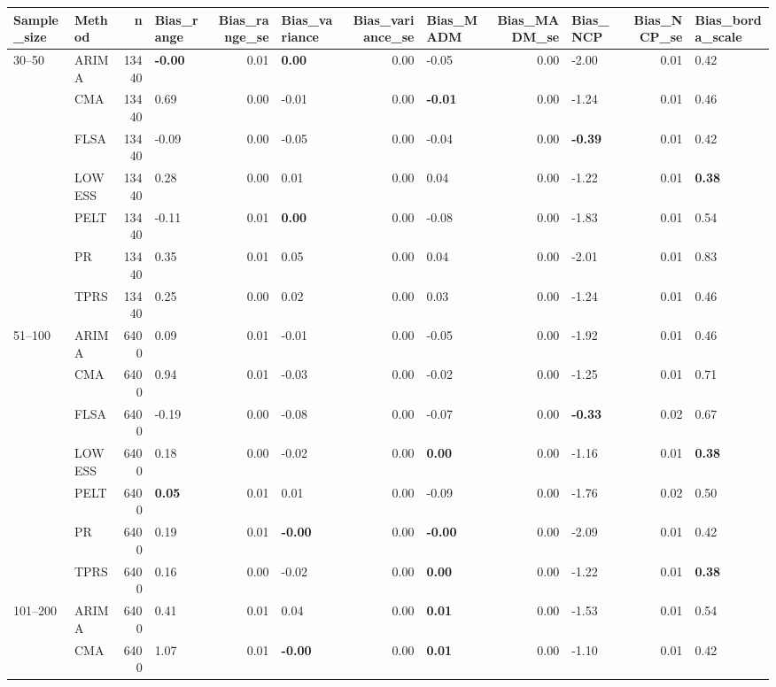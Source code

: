 \begin{table}[ht]
\centering
\begin{tabular}{llrlrlrlrlrl}
  \toprule
Sample_size & Method & n & Bias_range & Bias_range_se & Bias_variance & Bias_variance_se & Bias_MADM & Bias_MADM_se & Bias_NCP & Bias_NCP_se & Bias_borda_scale \\ 
  \midrule
30–50 & ARIMA & 13440 & \textbf{-0.00} & 0.01 & \textbf{0.00} & 0.00 & -0.05 & 0.00 & -2.00 & 0.01 & 0.42 \\ 
   & CMA & 13440 & 0.69 & 0.00 & -0.01 & 0.00 & \textbf{-0.01} & 0.00 & -1.24 & 0.01 & 0.46 \\ 
   & FLSA & 13440 & -0.09 & 0.00 & -0.05 & 0.00 & -0.04 & 0.00 & \textbf{-0.39} & 0.01 & 0.42 \\ 
   & LOWESS & 13440 & 0.28 & 0.00 & 0.01 & 0.00 & 0.04 & 0.00 & -1.22 & 0.01 & \textbf{0.38} \\ 
   & PELT & 13440 & -0.11 & 0.01 & \textbf{0.00} & 0.00 & -0.08 & 0.00 & -1.83 & 0.01 & 0.54 \\ 
   & PR & 13440 & 0.35 & 0.01 & 0.05 & 0.00 & 0.04 & 0.00 & -2.01 & 0.01 & 0.83 \\ 
   & TPRS & 13440 & 0.25 & 0.00 & 0.02 & 0.00 & 0.03 & 0.00 & -1.24 & 0.01 & 0.46 \\ 
  51–100 & ARIMA & 6400 & 0.09 & 0.01 & -0.01 & 0.00 & -0.05 & 0.00 & -1.92 & 0.01 & 0.46 \\ 
   & CMA & 6400 & 0.94 & 0.01 & -0.03 & 0.00 & -0.02 & 0.00 & -1.25 & 0.01 & 0.71 \\ 
   & FLSA & 6400 & -0.19 & 0.00 & -0.08 & 0.00 & -0.07 & 0.00 & \textbf{-0.33} & 0.02 & 0.67 \\ 
   & LOWESS & 6400 & 0.18 & 0.00 & -0.02 & 0.00 & \textbf{0.00} & 0.00 & -1.16 & 0.01 & \textbf{0.38} \\ 
   & PELT & 6400 & \textbf{0.05} & 0.01 & 0.01 & 0.00 & -0.09 & 0.00 & -1.76 & 0.02 & 0.50 \\ 
   & PR & 6400 & 0.19 & 0.01 & \textbf{-0.00} & 0.00 & \textbf{-0.00} & 0.00 & -2.09 & 0.01 & 0.42 \\ 
   & TPRS & 6400 & 0.16 & 0.00 & -0.02 & 0.00 & \textbf{0.00} & 0.00 & -1.22 & 0.01 & \textbf{0.38} \\ 
  101–200 & ARIMA & 6400 & 0.41 & 0.01 & 0.04 & 0.00 & \textbf{0.01} & 0.00 & -1.53 & 0.01 & 0.54 \\ 
   & CMA & 6400 & 1.07 & 0.01 & \textbf{-0.00} & 0.00 & \textbf{0.01} & 0.00 & -1.10 & 0.01 & 0.42 \\ 

\end{tabular}
\end{table}
